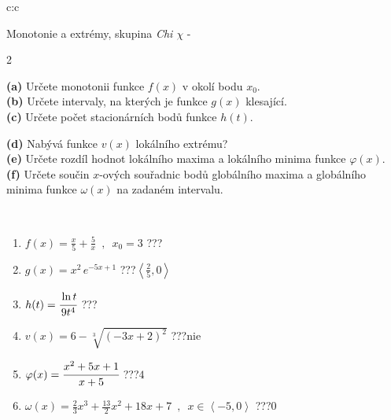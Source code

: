 \documentclass[10pt]{report}
\begin{document}
\newpage
\thispagestyle{empty}
\begin{tabular}{c:c}
\begin{minipage}[c][104.5mm][t]{0.5\linewidth}
\begin{center}
\vspace{7mm}
{\huge Monotonie a extrémy, skupina \textit{Chi $\chi$} -}\\[5mm]
\begin{minipage}{0.95\linewidth}
\begin{center}
{\small \begin{multicols}{2} \raggedright
\textbf{(a)} Určete monotonii funkce \(f(x)\) v okolí bodu \(x_0\). \\[1mm]
\textbf{(b)} Určete intervaly, na kterých je funkce \(g(x)\) klesající. \\[1mm]
\textbf{(c)} Určete počet stacionárních bodů funkce \(h(t)\). \par \columnbreak
\textbf{(d)} Nabývá funkce \(v(x)\) lokálního extrému? \\[1mm]
\textbf{(e)} Určete rozdíl hodnot lokálního maxima a lokálního minima funkce \(\varphi(x)\). \\[1mm]
\textbf{(f)} Určete součin \(x\)-ových souřadnic bodů globálního maxima a globálního minima funkce \(\omega(x)\) na zadaném intervalu. \\[1mm]
\end{multicols}
}
\end{center}
\end{minipage}
\\[4mm]
\begin{minipage}{0.79\linewidth}
\begin{center}
\begin{varwidth}{\linewidth}
\begin{enumerate}
\normalsize
\item $f(x)=\frac{x}{5}+\frac{5}{x} \enspace , \enspace x_0=3$\quad \dotfill\; ???\;\dotfill \quad {}
\item $g(x)=x^2\, e^{-5x+1}$\quad \dotfill\; ???\;\dotfill \quad $\left\langle\frac{2}{5} , 0\right\rangle$
\item $h(t)=\cfrac{\ln t}{9t^4}$\quad \dotfill\; ???\;\dotfill {}
\item $v(x)=6-\sqrt[3]{(-3x+2)^2}$\quad \dotfill\; ???\;\dotfill \quad $\text{nie}$
\item $\varphi(x)=\cfrac{x^2+5x+1}{x+5}$\quad \dotfill\; ???\;\dotfill \quad $4$
\item $\omega(x)=\frac{2}{3}x^3+\frac{13}{2}x^2+18x+7 \enspace , \enspace x\in\left\langle-5 , 0\right\rangle$\quad \dotfill\; ???\;\dotfill \quad $0$

\end{enumerate}
\end{varwidth}
\end{center}
\end{minipage}
\end{center}
\end{minipage}
\end{tabular}
\end{document}
